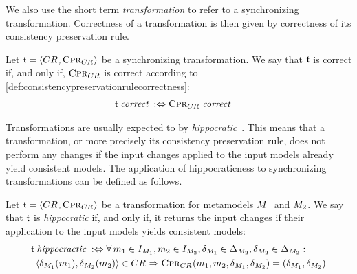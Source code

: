 We also use the short term \emph{transformation} to refer to a synchronizing transformation.
Correctness of a transformation is then given by correctness of its consistency preservation rule.

\begin{definition}
    \label{def:synchronizingtransformationcorrectness}
    Let $\transformation{t} = \tupled{\consistencyrelation{CR}{}, \consistencypreservationrule{\consistencyrelation{CR}{}}}$ be a synchronizing transformation.
    We say that $\transformation{t}$ is correct if, and only if, $\consistencypreservationrule{\consistencyrelation{CR}{}}$ is correct according to \autoref{def:consistencypreservationrulecorrectness}:
    \begin{align*}
        &
        \transformation{t} \correctmath \equivalentperdefinition \consistencypreservationrule{\consistencyrelation{CR}{}} \correctmath
    \end{align*}
\end{definition}

Transformations are usually expected to by \emph{hippocratic}~\cite{stevens2010sosym}.
This means that a transformation, or more precisely its consistency preservation rule, does not perform any changes if the input changes applied to the input models already yield consistent models.
The application of hippocraticness to synchronizing transformations can be defined as follows.
\begin{definition}
    \label{def:hippocratictransformation}
    Let $\transformation{t} = \tupled{\consistencyrelation{CR}{}, \consistencypreservationrule{\consistencyrelation{CR}{}}}$ be a transformation for metamodels $\metamodel{M}{1}$ and $\metamodel{M}{2}$.
    We say that $\transformation{t}$ is \emph{hippocratic} if, and only if, it returns the input changes if their application to the input models yields consistent models:
    \begin{align*}
        &
        \transformation{t} \mathtextspacearound{hippocractic} \equivalentperdefinition
        \forall
        \model{m}{1} \in \metamodelinstanceset{M}{1}, \model{m}{2} \in \metamodelinstanceset{M}{2}, 
        \change{\metamodel{M}{1}} \in \changeuniverse{\metamodel{M}{2}}, \change{\metamodel{M}{2}} \in \changeuniverse{\metamodel{M}{2}} : \\
        & \formulaskip[0.5em]
        \tupled{\change{\metamodel{M}{1}}(\model{m}{1}), \change{\metamodel{M}{2}}(\model{m}{2})} \in \consistencyrelation{CR}{} \Rightarrow \consistencypreservationrule{\consistencyrelation{CR}{}}(\model{m}{1}, \model{m}{2}, \change{\metamodel{M}{1}}, \change{\metamodel{M}{2}}) = (\change{\metamodel{M}{1}}, \change{\metamodel{M}{2}})
    \end{align*}
\end{definition}

